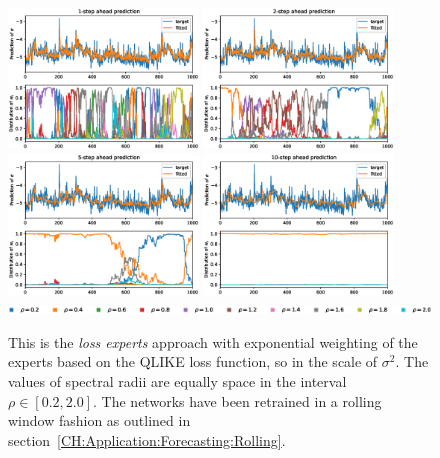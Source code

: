 \begin{figure}
    \begin{center}
        \includegraphics[width=0.45\textwidth]{Plots/Prediction/Experts_QLIKE_rolling_1step.eps}
        \includegraphics[width=0.45\textwidth]{Plots/Prediction/Experts_QLIKE_rolling_2step.eps} \\
        \includegraphics[width=0.45\textwidth]{Plots/Prediction/Experts_QLIKE_rolling_5step.eps}
        \includegraphics[width=0.45\textwidth]{Plots/Prediction/Experts_QLIKE_rolling_10step.eps} \\
        \includegraphics[width=1.0\textwidth]{Plots/Prediction/legend_experts.eps}
    \end{center}
    \caption{This is the \textit{loss experts} approach with exponential weighting of the experts based on the QLIKE loss function, so in the scale of $\sigma^2$. The values of spectral radii are equally space in the interval $\rho \in [0.2, 2.0]$. The networks have been retrained in a rolling window fashion as outlined in section \ref{CH:Application:Forecasting:Rolling}.}
    \label{FIG:ExpertsQLIKERolling}
\end{figure}


